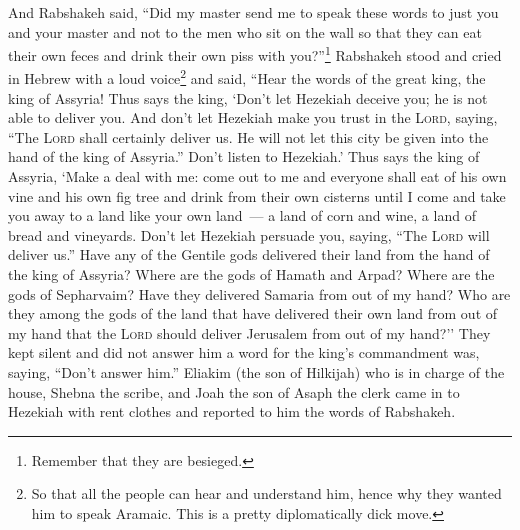 \begin{enumerate*}[mode=unboxed]
     And Rabshakeh said, ``Did my master send me to speak these words to just you and your master and not to the men who sit on the wall so that they can eat their own feces and drink their own piss with you?''\footnote{Remember that they are besieged.}%
     Rabshakeh stood and cried in Hebrew with a loud voice\footnote{So that all the people can hear and understand him, hence why they wanted him to speak Aramaic. This is a pretty diplomatically dick move.} and said, ``Hear the words of the great king, the king of Assyria!%
     Thus says the king, `Don't let Hezekiah deceive you; he is not able to deliver you.%
     And don't let Hezekiah make you trust in the \textsc{Lord}, saying, ``The \textsc{Lord} shall certainly deliver us. He will not let this city be given into the hand of the king of Assyria.''%
     Don't listen to Hezekiah.' Thus says the king of Assyria, `Make a deal with me: come out to me and everyone shall eat of his own vine and his own fig tree and drink from their own cisterns%
     until I come and take you away to a land like your own land~--- a land of corn and wine, a land of bread and vineyards.%
     Don't let Hezekiah persuade you, saying, ``The \textsc{Lord} will deliver us.'' Have any of the Gentile gods delivered their land from the hand of the king of Assyria?%
     Where are the gods of Hamath and Arpad? Where are the gods of Sepharvaim? Have they delivered Samaria from out of my hand?%
     Who are they among the gods of the land that have delivered their own land from out of my hand that the \textsc{Lord} should deliver Jerusalem from out of my hand?''%
     They kept silent and did not answer him a word for the king's commandment was, saying, ``Don't answer him.''%
     Eliakim (the son of Hilkijah) who is in charge of the house, Shebna the scribe, and Joah the son of Asaph the clerk came in to Hezekiah with rent clothes and reported to him the words of Rabshakeh.%
\end{enumerate*}
